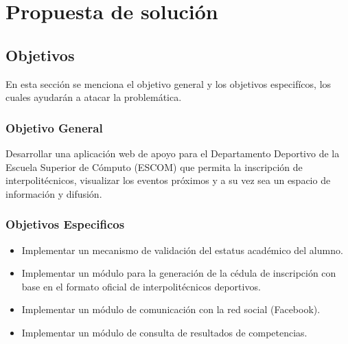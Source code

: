 \chapter{Propuesta de solución}

\section{Objetivos}
\noindent En esta sección se menciona el objetivo general y los objetivos especifícos, los cuales ayudarán a atacar la problemática.
\subsection{Objetivo General}
\noindent Desarrollar una aplicación web de apoyo para el Departamento Deportivo de la Escuela Superior de Cómputo (ESCOM) que permita la inscripción de interpolitécnicos, visualizar los eventos próximos y a su vez sea un espacio de información y difusión.
\subsection{Objetivos Especificos}
\begin{itemize}
	\item Implementar un mecanismo de validación del estatus académico del alumno. 
	\item Implementar un módulo para la generación de la cédula de inscripción con base en el formato oficial de interpolitécnicos deportivos. 
	\item Implementar un módulo de comunicación con la red social (Facebook). 
	\item Implementar un módulo de consulta de resultados de competencias.
\end{itemize}

	
